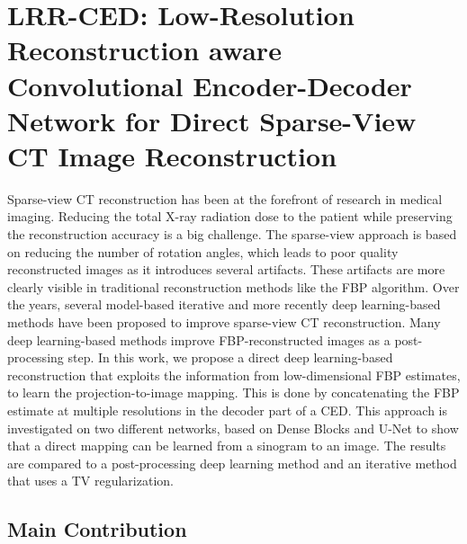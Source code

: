 
\chapter{LRR-CED: Low-Resolution Reconstruction aware Convolutional Encoder-Decoder Network  for Direct Sparse-View CT Image Reconstruction} %
\label{Chapter4} %

Sparse-view \ac{CT} reconstruction has been at the forefront of research in medical imaging. Reducing the total X-ray radiation dose to the patient while preserving the reconstruction accuracy is a big challenge. The sparse-view approach is based on reducing the number of rotation angles, which leads to poor quality reconstructed images as it introduces several artifacts. These artifacts are more clearly visible in traditional reconstruction methods like the \ac{FBP} algorithm. Over the years, several model-based iterative and more recently deep learning-based methods have been proposed to improve sparse-view \ac{CT} reconstruction. Many deep learning-based methods improve \ac{FBP}-reconstructed images as a post-processing step. In this work, we propose a direct deep learning-based reconstruction that exploits the information from low-dimensional \ac{FBP} estimates, to learn the  projection-to-image mapping. This is done by concatenating the \ac{FBP} estimate at multiple resolutions in the decoder part of a \ac{CED}. This approach is investigated on two different networks, based on Dense Blocks and U-Net to show that a direct mapping can be learned from a sinogram to an image.  The results are compared to a post-processing deep learning method and an iterative method that uses a \ac{TV} regularization. 


\section{Main Contribution}

